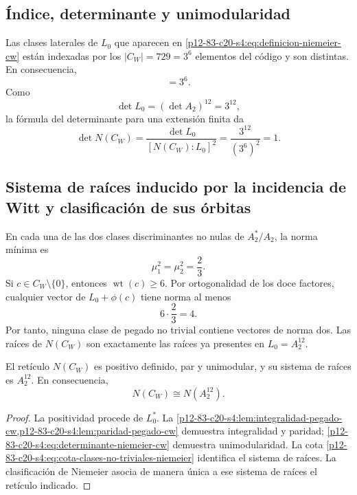 \subsection{Índice, determinante y unimodularidad}

Las clases laterales de \(L_0\) que aparecen en
\eqref{p12-83-c20-s4:eq:definicion-niemeier-cw} están indexadas por los
\(|C_W|=729=3^6\) elementos del código y son distintas. En consecuencia,
\begin{equation}
 [N(C_W):L_0]=3^6.
 \label{p12-83-c20-s4:eq:indice-niemeier-sobre-a2-doce}
\end{equation}
Como
\[
 \det L_0=(\det A_2)^{12}=3^{12},
\]
la fórmula del determinante para una extensión finita da
\begin{equation}
 \det N(C_W)
 =\frac{\det L_0}{[N(C_W):L_0]^2}
 =\frac{3^{12}}{(3^6)^2}=1.
 \label{p12-83-c20-s4:eq:determinante-niemeier-cw}
\end{equation}

\subsection{Sistema de raíces inducido por la incidencia de Witt y clasificación de sus órbitas}

En cada una de las dos clases discriminantes no nulas de
\(A_2^*/A_2\), la norma mínima es
\[
 \mu_1^2=\mu_2^2=\frac23.
\]
Si \(c\in C_W\setminus\{0\}\), entonces
\(\operatorname{wt}(c)\geq6\). Por ortogonalidad de los doce factores,
cualquier vector de \(L_0+\phi(c)\) tiene norma al menos
\begin{equation}
 6\cdot\frac23=4.
 \label{p12-83-c20-s4:eq:cota-clases-no-triviales-niemeier}
\end{equation}
Por tanto, ninguna clase de pegado no trivial contiene vectores de norma
dos. Las raíces de \(N(C_W)\) son exactamente las raíces ya presentes en
\(L_0=A_2^{12}\).

\begin{theorem}
\label{p12-83-c20-s4:thm:niemeier-a2-doce-autonomo}
El retículo \(N(C_W)\) es positivo definido, par y unimodular, y su sistema
de raíces es \(A_2^{12}\). En consecuencia,
\begin{equation}
 \boxed{N(C_W)\cong N(A_2^{12}).}
 \label{p12-83-c20-s4:eq:identificacion-niemeier-a2-doce}
\end{equation}
\end{theorem}

\begin{proof}
La positividad procede de \(L_0^*\). La
\cref{p12-83-c20-s4:lem:integralidad-pegado-cw,p12-83-c20-s4:lem:paridad-pegado-cw} demuestra
integralidad y paridad; \eqref{p12-83-c20-s4:eq:determinante-niemeier-cw} demuestra
unimodularidad. La cota \eqref{p12-83-c20-s4:eq:cota-clases-no-triviales-niemeier}
identifica el sistema de raíces. La clasificación de Niemeier asocia de
manera única a ese sistema de raíces el retículo indicado.
\end{proof}

